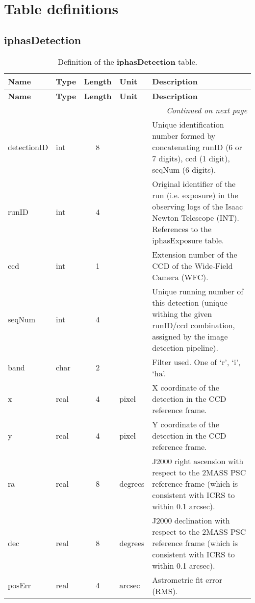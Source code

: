 \documentclass[12pt]{article}
\begin{document}
\newpage
\section{Table definitions}
\subsection{iphasDetection}

\begin{center}
\begin{longtable}{llclp{10cm}}
\caption[short]{Definition of the \textbf{iphasDetection} table.} \label{iphasSource} \\

\hline \textbf{Name} & \textbf{Type} & \textbf{Length} & \textbf{Unit} & \textbf{Description} \\ \hline
\endfirsthead

\hline \textbf{Name} & \textbf{Type} & \textbf{Length} & \textbf{Unit} & \textbf{Description} \\ \hline
\endhead

\hline \multicolumn{5}{r}{{\it Continued on next page}} \\ 
\endfoot

\hline \hline
\endlastfoot

detectionID & int & 8 & & Unique identification number formed by concatenating runID (6 or 7 digits), ccd (1 digit), seqNum (6 digits). \\
runID & int & 4 & & Original identifier of the run (i.e. exposure) in the observing logs of the Isaac Newton Telescope (INT). 
References to the iphasExposure table. \\
ccd & int & 1 & & Extension number of the CCD of the Wide-Field Camera (WFC). \\
seqNum & int & 4 & & Unique running number of this detection (unique withing the given runID/ccd combination, assigned by the image detection pipeline). \\
band & char & 2 & & Filter used. One of `r', `i', `ha'. \\ 
x & real & 4 & pixel & X coordinate of the detection in the CCD reference frame. \\
y & real & 4 & pixel & Y coordinate of the detection in the CCD reference frame. \\
ra & real & 8 & degrees & J2000 right ascension with respect to the 2MASS PSC reference frame (which is consistent with ICRS to within 0.1 arcsec). \\
dec & real & 8 & degrees & J2000 declination with respect to the 2MASS PSC reference frame (which is consistent with ICRS to within 0.1 arcsec). \\
posErr & real & 4 & arcsec & Astrometric fit error (RMS). \\


\end{longtable}
\end{center}
\end{document}
